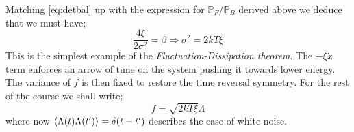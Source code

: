 \begin{definitionbox}
Matching \eqref{eq:detbal} up with the expression for $\mathbb{P}_F/\mathbb{P}_B$ derived above we deduce that we must have;
\begin{equation}
\frac{4\xi}{2\sigma^2} = \beta \Rightarrow \sigma^2 = 2kT\xi
\end{equation}
This is the simplest example of the \emph{Fluctuation-Dissipation theorem}. The $-\xi \dot{x}$ term enforces an arrow of time on the system pushing it towards lower energy. The variance of $f$ is then fixed to restore the time reversal symmetry. For the rest of the course we shall write;
\begin{equation}
f = \sqrt{2kT\xi}\Lambda
\end{equation}
where now $\left< \Lambda(t)\Lambda(t\pr) \right> = \delta(t - t\pr)$ describes the case of white noise.
\end{definitionbox}
